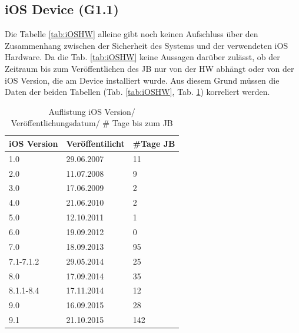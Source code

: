 \subsection{iOS Device (G1.1)}
\label{sec:Frage1iOSDevice} 

Die Tabelle \ref{tab:iOSHW} alleine gibt noch keinen Aufschluss über den Zusammenhang zwischen der Sicherheit des Systems und der verwendeten iOS Hardware. Da die Tab. \ref{tab:iOSHW} keine Aussagen darüber zulässt, ob der Zeitraum bis zum Veröffentlichen des JB nur von der HW abhängt oder von der iOS Version, die am Device installiert wurde. Aus diesem Grund müssen die Daten der beiden Tabellen (Tab. \ref{tab:iOSHW}, Tab. \ref{tab:iOSVersion}) korreliert werden. \par 
\begin{table}[htp!]
    \begin{center}
        \begin{tabular}{|l|l|l|} \hline
         \textbf{iOS Version} & \textbf{Veröffentilicht} & \textbf{\#Tage JB}\\ \hline    
        1.0 & 29.06.2007 & 11\\ \hline 
        2.0 & 11.07.2008	& 9\\ \hline 
        3.0 & 17.06.2009	& 2\\ \hline 
        4.0 & 21.06.2010 & 2\\ \hline 
        5.0 & 12.10.2011	& 1\\ \hline 
        6.0 & 19.09.2012	& 0\\ \hline 
        7.0 & 18.09.2013	& 95\\ \hline 
        7.1-7.1.2 & 29.05.2014 & 25\\ \hline 
        8.0 & 17.09.2014	& 35\\ \hline 
        8.1.1-8.4 & 17.11.2014	& 12\\ \hline 
        9.0 & 16.09.2015	& 28\\ \hline
        9.1 & 21.10.2015	& 142\\ \hline 
        \end{tabular} 
        \caption{Auflistung iOS Version/ Veröffentlichungsdatum/ \# Tage bis zum JB \protect\footnotemark}
        \label{tab:iOSVersion}
    \end{center}
\end{table}

